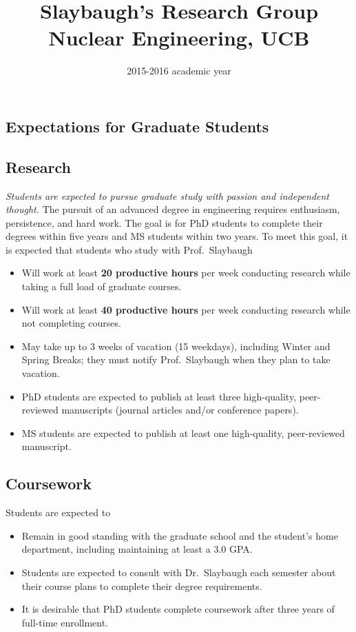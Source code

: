 \documentclass[12pt,twoside]{article}
\date{2015-2016 academic year}
\title{Slaybaugh's Research Group \\ Nuclear Engineering, UCB}
\begin{document}
\maketitle


\begin{center}
\section*{Expectations for Graduate Students}
\end{center}

\subsection*{Research}

\textit{Students are expected to pursue graduate study with passion and independent thought.} The pursuit of an advanced degree in engineering requires enthusiasm, persistence, and hard work. The goal is for PhD students to complete their degrees within five years and MS students within two years. To meet this goal, it is expected that students who study with Prof.\ Slaybaugh
%
\begin{itemize}
\item Will work at least \textbf{20 productive hours} per week conducting research while taking a full load of graduate courses.
\item Will work at least \textbf{40 productive hours} per week conducting research while not completing courses.
\item May take up to 3 weeks of vacation (15 weekdays), including Winter and Spring Breaks; they must notify Prof.\ Slaybaugh when they plan to take vacation.
\item PhD students are expected to publish at least three high-quality, peer-reviewed manuscripts (journal articles and/or conference papers).
\item MS students are expected to publish at least one high-quality, peer-reviewed manuscript.
\end{itemize}

\subsection*{Coursework}

Students are expected to 
%
\begin{itemize}
\item Remain in good standing with the graduate school and the student's home department, including maintaining at least a 3.0 GPA.
\item Students are expected to consult with Dr.\ Slaybaugh each semester about their course plans to complete their degree requirements.
\item It is desirable that PhD students complete coursework after three years of full-time enrollment. 
\end{itemize}
\end{document}
